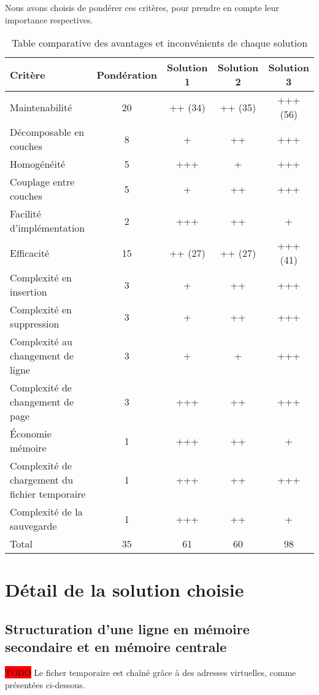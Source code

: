 Nous avons choisis de pondérer ces critères, pour prendre en compte leur
importance respectives.

\begin{table}[H]
	\centering
	\begin{tabular}{l c|c|c|c}
		Critère & Pondération & Solution 1 & Solution 2 & Solution 3 \\
		\hline \hline
		Maintenabilité & 20 & ++ (34) & ++ (35) & +++ (56) \\
		\hline
		Décomposable en couches & 8 & + & ++ & +++ \\
		Homogénéité & 5 & +++ & + & +++ \\
		Couplage entre couches & 5 & + & ++ & +++ \\
		Facilité d'implémentation & 2 & +++ & ++ & + \\
		\hline \hline
		Efficacité & 15 & ++ (27) & ++ (27) & +++ (41) \\
		\hline
		Complexité en insertion & 3 & + & ++ & +++ \\
		Complexité en suppression & 3 & + & ++ & +++ \\
		Complexité au changement de ligne & 3 & + & + & +++ \\
		Complexité de changement de page & 3 & +++ & ++ & +++ \\
		Économie mémoire & 1 & +++ & ++ & + \\
		Complexité de chargement du fichier temporaire & 1 & +++ & ++ & +++ \\
		Complexité de la sauvegarde & 1 & +++ & ++ & + \\
		\hline
		Total & 35 & 61 & 60 & 98 \\
	\end{tabular}
	\vspace{0.5cm}
	\caption{Table comparative des avantages et inconvénients de chaque solution}
\end{table}



\section{Détail de la solution choisie}

\subsection{Structuration d'une ligne en mémoire secondaire et en mémoire centrale}
\colorbox{red}{\huge TODO}
Le ficher temporaire est chaîné grâce à des adresses virtuelles, comme présentées ci-dessous.

